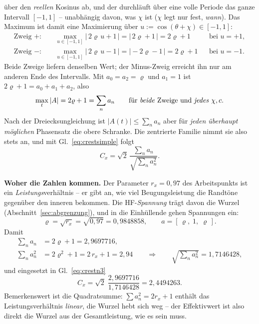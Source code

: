 \documentclass[11pt,a4paper]{article}
\newcommand{\crest}{\ensuremath{C}}
\begin{document}
über den \emph{reellen} Kosinus ab, und der durchläuft über eine volle
Periode das ganze Intervall $[-1,1]$ -- unabhängig davon, was $\chi$ ist
($\chi$ legt nur fest, \emph{wann}). Das Maximum ist damit eine
Maximierung über $u := \cos(\theta+\chi) \in [-1,1]$:
\begin{align}
  \text{Zweig }+:&\quad \max_{u\in[-1,1]} |\,2\varrho\,u + 1\,| = |\,2\varrho+1\,| = 2\varrho+1
    &&\text{bei } u=+1 ,\\
  \text{Zweig }-:&\quad \max_{u\in[-1,1]} |\,2\varrho\,u - 1\,| = |\!-\!2\varrho-1\,| = 2\varrho+1
    &&\text{bei } u=-1 .
\end{align}
Beide Zweige liefern denselben Wert; der Minus-Zweig erreicht ihn nur am
anderen Ende des Intervalls. Mit $a_0=a_2=\varrho$ und $a_1=1$ ist
$2\varrho+1 = a_0+a_1+a_2$, also
\begin{equation}
  \max_t |A| = 2\varrho+1 = \sum_n a_n
  \qquad\text{für \emph{beide} Zweige und \emph{jedes} } \chi, c .
\end{equation}
Nach der Dreiecksungleichung ist $|A(t)|\le\sum_n a_n$ aber für
\emph{jeden überhaupt möglichen} Phasensatz die obere Schranke. Die
zentrierte Familie nimmt sie also stets an, und mit
Gl.~\eqref{eq:crestsimple} folgt
\begin{equation}
  \crest_x = \sqrt2\,\frac{\sum_n a_n}{\sqrt{\sum_n a_n^2}} .
  \label{eq:crestn3}
\end{equation}

\medskip
\noindent\textbf{Woher die Zahlen kommen.} Der Parameter $r_x = 0{,}97$ des
Arbeitspunkts ist ein \emph{Leistungs}verhältnis -- er gibt an, wie viel
Beugungsleistung die Randtöne gegenüber den inneren bekommen. Die
HF-\emph{Spannung} trägt davon die Wurzel (Abschnitt~\ref{sec:abgrenzung}),
und in die Einhüllende gehen Spannungen ein:
\begin{equation}
  \varrho = \sqrt{r_x} = \sqrt{0{,}97} = 0{,}9848858 ,
  \qquad a = [\,\varrho,\;1,\;\varrho\,] .
\end{equation}
Damit
\begin{align}
  \sum_n a_n &= 2\varrho+1 = 2{,}9697716 ,\\
  \sum_n a_n^2 &= 2\varrho^2+1 = 2\,r_x + 1 = 2{,}94
    \qquad\Longrightarrow\qquad
  \sqrt{\textstyle\sum_n a_n^2} = 1{,}7146428 ,
\end{align}
und eingesetzt in Gl.~\eqref{eq:crestn3}
\begin{equation}
  \crest_x = \sqrt2\;\frac{2{,}9697716}{1{,}7146428} = 2{,}4494263 .
\end{equation}
Bemerkenswert ist die Quadratsumme: $\sum a_n^2 = 2r_x+1$ enthält das
Leistungsverhältnis \emph{linear}, die Wurzel hebt sich weg -- der
Effektivwert ist also direkt die Wurzel aus der Gesamtleistung, wie es sein
muss.
\end{document}
